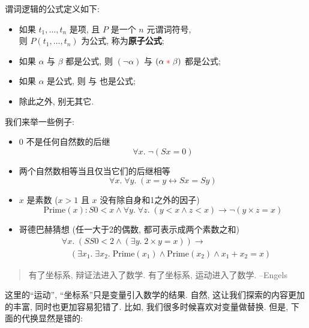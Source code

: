 \begin{definition}[公式 (Formula)] 谓词逻辑的公式定义如下: 
  \begin{itemize}
    \item 如果 $t_{1}, \dots, t_{n}$ 是项, 且 $P$ 是一个 $n$ 元谓词符号, \\
      则 $P(t_{1}, \dots, t_{n})$ 为公式, 称为{\bf 原子公式};
    \item 如果 $\alpha$ 与 $\beta$ 都是公式, 则 $(\lnot \alpha)$
      与 $(\alpha \;\textcolor{red}{\ast}\; \beta)$ 都是公式;
    \item 如果 $\alpha$ 是公式, 则 
      与  也是公式;
    \item 除此之外, 别无其它. 
  \end{itemize}
\end{definition}

我们来举一些例子: 

\begin{example}
	\begin{itemize}
    \item 0 不是任何自然数的后继
        \[
          \forall x.\; \lnot (Sx = 0)
        \]
      \item 两个自然数相等当且仅当它们的后继相等
        \[
          \forall x.\; \forall y.\; (x = y \leftrightarrow Sx = Sy)
        \]
      \item $x$ 是素数 ($x > 1$ 且 $x$ 没有除自身和1之外的因子)
        \[
          \text{Prime}(x): S0 < x \land \forall y.\; \forall z.\; (y < x \land z < x) \to \lnot (y \times z = x)
        \]
      \item 哥德巴赫猜想 (任一大于2的偶数, 都可表示成两个素数之和)
        \begin{align*}
          &\forall x.\; (SS0 < 2 \land (\exists y.\; 2 \times y = x)) \to \\
            &\quad (\exists x_{1}.\; \exists x_{2}.\; \text{Prime}(x_{1}) \land \text{Prime}(x_{2})
              \land x_{1} + x_{2} = x)
        \end{align*}
  \end{itemize}

\end{example}

\begin{quote}
有了坐标系, 辩证法进入了数学. 有了坐标系, 运动进入了数学. 
\hfill --Engels
\end{quote}

这里的``运动'', ``坐标系''只是变量引入数学的结果. 自然, 这让我们探索的内容更加的丰富, 同时也更加容易犯错了. 比如, 我们很多时候喜欢对变量做替换. 但是, 下面的代换显然是错的: 


